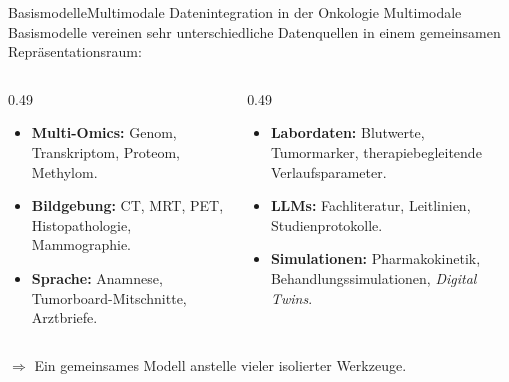 \documentclass[final]{beamer}
\begin{document}
\begin{frame}[t]{Basismodelle}{Multimodale Datenintegration in der Onkologie}
\vspace{0.2em}
Multimodale Basismodelle vereinen sehr unterschiedliche Datenquellen
in einem gemeinsamen Repräsentationsraum:
\vspace{0.4em}
\begin{columns}[T]
  \begin{column}{0.49\textwidth}
    \begin{itemize}\itemsep=0.15em\small
      \item \textbf{Multi-Omics:} Genom, Transkriptom, Proteom,
            Methylom.
      \item \textbf{Bildgebung:} CT, MRT, PET, Histopathologie,
            Mammographie.
      \item \textbf{Sprache:} Anamnese, Tumorboard-Mitschnitte,
            Arztbriefe.
    \end{itemize}
  \end{column}
  \begin{column}{0.49\textwidth}
    \begin{itemize}\itemsep=0.15em\small
      \item \textbf{Labordaten:} Blutwerte, Tumormarker,
            therapiebegleitende Verlaufsparameter.
      \item \textbf{LLMs:} Fachliteratur, Leitlinien,
            Studienprotokolle.
      \item \textbf{Simulationen:} Pharmakokinetik,
            Behandlungssimulationen, \emph{Digital Twins}.
    \end{itemize}
  \end{column}
\end{columns}
\vspace{0.6em}
\begin{center}\small
  $\Rightarrow$ Ein gemeinsames Modell anstelle vieler isolierter Werkzeuge.
\end{center}
\end{frame}
\end{document}
